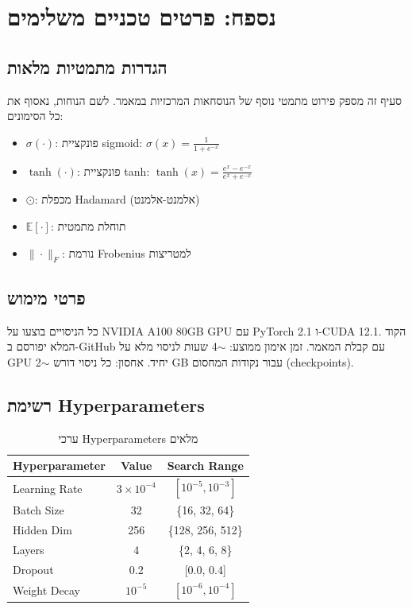 
\clearpage
\chapter{נספח: פרטים טכניים משלימים}

\section{הגדרות מתמטיות מלאות}

סעיף זה מספק פירוט מתמטי נוסף של הנוסחאות המרכזיות במאמר.
לשם הנוחות, נאסוף את כל הסימונים:

\begin{itemize}
\item \(\sigma(\cdot)\): פונקציית \textenglish{sigmoid}: \(\sigma(x) = \frac{1}{1+e^{-x}}\)
\item \(\tanh(\cdot)\): פונקציית \textenglish{tanh}: \(\tanh(x) = \frac{e^x - e^{-x}}{e^x + e^{-x}}\)
\item \(\odot\): מכפלת \textenglish{Hadamard} (אלמנט-אלמנט)
\item \(\mathbb{E}[\cdot]\): תוחלת מתמטית
\item \(\|\cdot\|_F\): נורמת \textenglish{Frobenius} למטריצות
\end{itemize}

\section{פרטי מימוש}

כל הניסויים בוצעו על \textenglish{NVIDIA A100 80GB GPU} עם \textenglish{PyTorch 2.1} ו-\textenglish{CUDA 12.1}.
הקוד המלא יפורסם ב-\textenglish{GitHub} עם קבלת המאמר. 
זמן אימון ממוצע: \textenglish{$\sim$4 שעות} לניסוי מלא על \textenglish{GPU} יחיד.
אחסון: כל ניסוי דורש \textenglish{$\sim$2 GB} עבור נקודות המחסום (\textenglish{checkpoints}).

\section{רשימת \textenglish{Hyperparameters}}

\begin{table}[H]
\centering
\caption{ערכי \textenglish{Hyperparameters} מלאים}
\label{tab:hparams}
\begin{english}
\begin{tabular}{lcc}
\toprule
\textbf{Hyperparameter} & \textbf{Value} & \textbf{Search Range} \\
\midrule
Learning Rate       & $3 \times 10^{-4}$ & $[10^{-5}, 10^{-3}]$ \\
Batch Size          & 32              & \{16, 32, 64\}       \\
Hidden Dim          & 256             & \{128, 256, 512\}    \\
Layers              & 4               & \{2, 4, 6, 8\}       \\
Dropout             & 0.2             & [0.0, 0.4]           \\
Weight Decay        & $10^{-5}$       & $[10^{-6}, 10^{-4}]$ \\
\bottomrule
\end{tabular}
\end{english}
\end{table}
